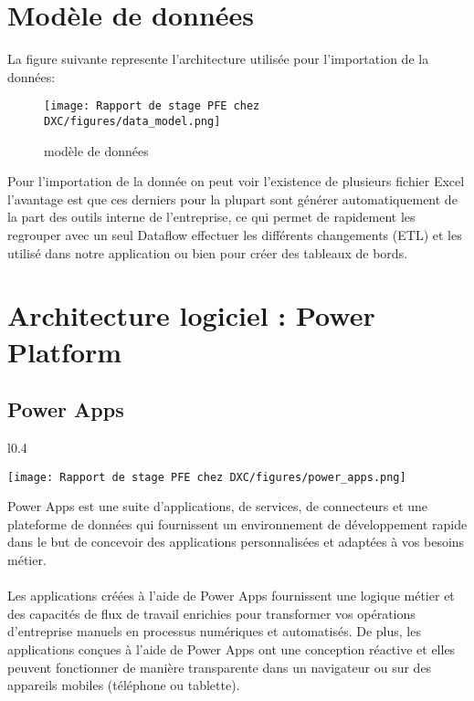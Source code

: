 \newpage
\section{Modèle de données}

La figure suivante represente l'architecture utilisée pour l'importation de la données: 
\begin{figure}[!h]
    \centering
    \texttt{[image: Rapport de stage PFE chez DXC/figures/data\_model.png]}
    \caption{modèle de données}
\end{figure}

Pour l'importation de la donnée on peut voir l'existence de plusieurs fichier Excel l'avantage est que ces derniers pour la plupart sont générer automatiquement de la part des outils interne de l'entreprise, ce qui permet de rapidement les regrouper avec un seul Dataflow effectuer les différents changements (ETL) et les utilisé dans notre application ou bien pour créer des tableaux de bords.

\section{Architecture logiciel : Power Platform }

\subsection{Power Apps }
\vspace{0.5cm}

\begin{wrapfigure}{l}{0.4\textwidth}
  \begin{center}
    \texttt{[image: Rapport de stage PFE chez DXC/figures/power\_apps.png]}
  \end{center}
\end{wrapfigure}

Power Apps est une suite d’applications, de services, de connecteurs et une plateforme de données qui fournissent un environnement de développement rapide dans le but de concevoir des applications personnalisées et adaptées à vos besoins métier.
\\
\\
Les applications créées à l’aide de Power Apps fournissent une logique métier et des capacités de flux de travail enrichies pour transformer vos opérations d’entreprise manuels en processus numériques et automatisés. De plus, les applications conçues à l’aide de Power Apps ont une conception réactive et elles peuvent fonctionner de manière transparente dans un navigateur ou sur des appareils mobiles (téléphone ou tablette).


